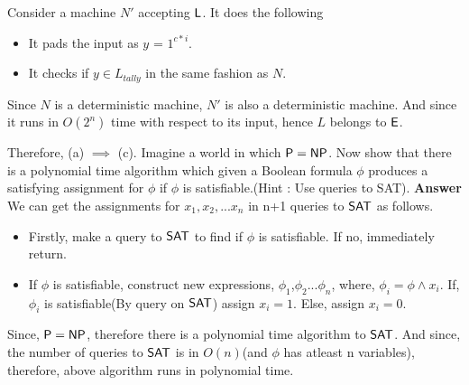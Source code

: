 \documentclass[addpoints,12pt]{exam}
\begin{document}
\begin{questions}
Consider a machine $N'$ accepting ${\mathsf{L}}$. It does the following
\begin{itemize}
 \item It pads the input as $y$ = $1^{c \ast i}$.
 \item It checks if $y \in L_{tally}$ in the same fashion as $N$. 
\end{itemize}
Since $N$ is a deterministic machine, $N'$ is also a deterministic machine. And since it runs in $O(2^{n})$ time with respect to its input, hence $L$ belongs to ${\mathsf{E}}$.

Therefore, (a) $\implies$ (c).
\question[7] 
Imagine a world in which ${\mathsf{P}} = {\mathsf{NP}}$. Now show that there is a
polynomial time algorithm which given a Boolean formula $\phi$ produces a satisfying assignment for $\phi$ if $\phi$ is satisfiable.(Hint : Use queries to SAT).
\newline
\textbf{Answer}\newline
We can get the assignments for $x_{1},x_{2},...x_{n}$ in n+1 queries to ${\mathsf{SAT}}$ as follows.
\begin{itemize}
 \item Firstly, make a query to ${\mathsf{SAT}}$ to find if $\phi$ is satisfiable. If no, immediately return.
 \item If $\phi$ is satisfiable, construct new expressions, $\phi_{1}$,$\phi_{2}$...$\phi_{n}$, where,
    $\phi_{i}=\phi \wedge x_{i}$.\newline
    If, $\phi_{i}$ is satisfiable(By query on ${\mathsf{SAT}}$) assign $x_{i}=1$. Else, assign $x_{i}=0$.
\end{itemize}

Since, ${\mathsf{P}} = {\mathsf{NP}}$, therefore there is a polynomial time algorithm to ${\mathsf{SAT}}$. And since, the number of queries to ${\mathsf{SAT}}$ is in $O(n)$(and $\phi$ has atleast n variables), therefore,
above algorithm runs in polynomial time.



\end{questions}
\end{document}

